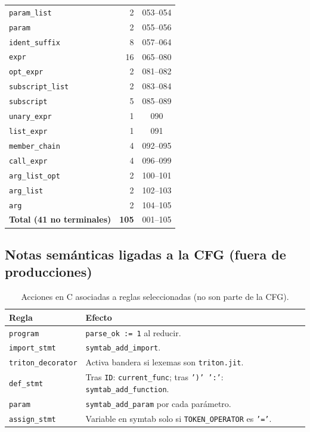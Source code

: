 \begin{longtable}{@{}p{4.0cm}rc@{}}
\texttt{param\_list} & 2 & 053--054 \\
\texttt{param} & 2 & 055--056 \\
\texttt{ident\_suffix} & 8 & 057--064 \\
\texttt{expr} & 16 & 065--080 \\
\texttt{opt\_expr} & 2 & 081--082 \\
\texttt{subscript\_list} & 2 & 083--084 \\
\texttt{subscript} & 5 & 085--089 \\
\texttt{unary\_expr} & 1 & 090 \\
\texttt{list\_expr} & 1 & 091 \\
\texttt{member\_chain} & 4 & 092--095 \\
\texttt{call\_expr} & 4 & 096--099 \\
\texttt{arg\_list\_opt} & 2 & 100--101 \\
\texttt{arg\_list} & 2 & 102--103 \\
\texttt{arg} & 2 & 104--105 \\
\midrule
\textbf{Total (41 no terminales)} & \textbf{105} & 001--105 \\
\bottomrule
\end{longtable}

\subsection{Notas semánticas ligadas a la CFG (fuera de producciones)}
\label{sub:acciones-cfg}

\begin{table}[H]
\centering
\caption{Acciones en C asociadas a reglas seleccionadas (no son parte de la CFG).}
\scriptsize
\begin{tabular}{@{}p{2.8cm}p{9.5cm}@{}}
\toprule
\textbf{Regla} & \textbf{Efecto} \\
\midrule
\texttt{program} & \texttt{parse\_ok := 1} al reducir. \\
\texttt{import\_stmt} & \texttt{symtab\_add\_import}. \\
\texttt{triton\_decorator} & Activa bandera si lexemas son \texttt{triton.jit}. \\
\texttt{def\_stmt} & Tras \texttt{ID}: \texttt{current\_func}; tras \texttt{')' ':'}: \texttt{symtab\_add\_function}. \\
\texttt{param} & \texttt{symtab\_add\_param} por cada parámetro. \\
\texttt{assign\_stmt} & Variable en symtab solo si \texttt{TOKEN\_OPERATOR} es \texttt{'='}. \\
\bottomrule
\end{tabular}
\end{table}

